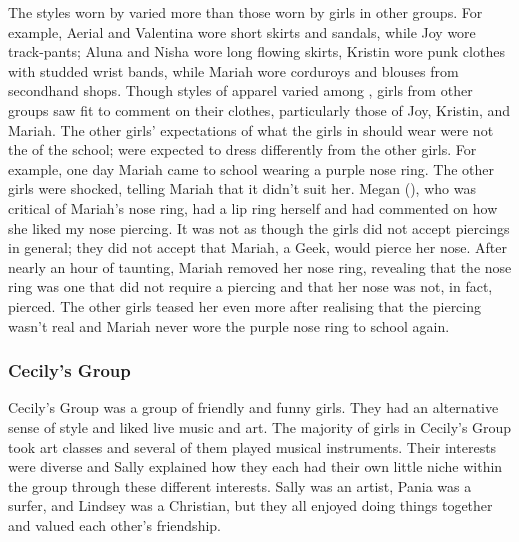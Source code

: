 The styles worn by  varied more than those worn by girls in other groups. For example, Aerial and Valentina wore short skirts and sandals, while Joy wore track-pants; Aluna and Nisha wore long flowing skirts, Kristin wore punk clothes with studded wrist bands, while Mariah wore corduroys and blouses from secondhand shops. Though styles of apparel varied among , girls from other groups saw fit to comment on their clothes, particularly those of Joy, Kristin, and Mariah. The other girls' expectations of what the girls in  should wear were not the  of the school;  were expected to dress differently from the other girls. For example, one day Mariah came to school wearing a purple nose ring. The other girls were shocked, telling Mariah that it didn't suit her. Megan (), who was critical of Mariah's nose ring, had a lip ring herself and had commented on how she liked my nose piercing. It was not as though the girls did not accept piercings in general; they did not accept that Mariah, a Geek, would pierce her nose. After nearly an hour of taunting, Mariah removed her nose ring, revealing that the nose ring was one that did not require a piercing and that her nose was not, in fact, pierced. The other girls teased her even more after realising that the piercing wasn't real and Mariah never wore the purple nose ring to school again. 


\subsubsection{Cecily's Group}

Cecily's Group was a group of friendly and funny girls. They had an alternative sense of style and liked live music and art. The majority of girls in Cecily's Group took art classes and several of them played musical instruments. Their interests were diverse and Sally explained how they each had their own little niche within the group through these different interests. Sally was an artist, Pania was a surfer, and Lindsey was a Christian, but they all enjoyed doing things together and valued each other's friendship.

